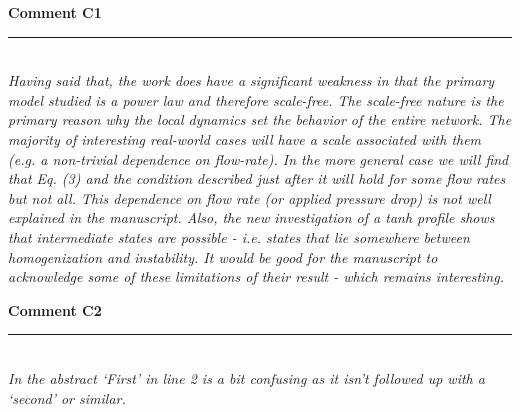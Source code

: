 \documentclass{article}
\newcommand{\Hline}{\rule{\linewidth}{.1mm}}
\newcommand{\Question}[1]{\noindent \color{black}\emph{#1}\normalcolor}
\newcommand{\Answer}[1]{\noindent {\color{blue}{ #1}}\normalcolor}
\begin{document}
\Answer{We thank the reviewer for their thoughtful and thorough comments.}



\vspace{0.5cm}
\textbf{Comment C1}
\noindent \vspace{-0.2cm}\\ \Hline\\

\Question{Having said that, the work does have a significant weakness in that
the primary model studied is a power law and therefore scale-free. The
scale-free nature is the primary reason why the local dynamics set the
behavior of the entire network. The majority of interesting real-world
cases will have a scale associated with them (e.g. a non-trivial
dependence on flow-rate). In the more general case we will find that
Eq. (3) and the condition described just after it will hold for some
flow rates but not all. This dependence on flow rate (or applied
pressure drop) is not well explained in the manuscript. Also, the new
investigation of a tanh profile shows that intermediate states are
possible - i.e. states that lie somewhere between homogenization and
instability. It would be good for the manuscript to acknowledge some
of these limitations of their result - which remains interesting.\newline}

\Answer{We thank the reviewer for the valuable comment. Indeed our model has limitations. We have now expanded our conclusion to include such limitations as mentioned by the reviewer.


admit scale free after Eq. 3

If not parallel, g(r) can be more complex 

acknowledge inbetween cases in the main text ...
}
 



\vspace{0.5cm}
\textbf{Comment C2}
\noindent \vspace{-0.2cm}\\ \Hline\\


\Question{In the abstract `First' in line 2 is a bit confusing as it isn't
followed up with a `second' or similar.\newline}


\Answer{We would like to thank the reviewer for carefully reading our manuscript. We removed `First' in the abstract to avoid any confusion.}
%
\\
\end{document}
